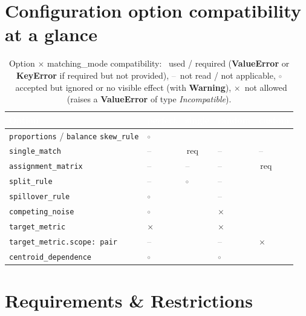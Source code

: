 \documentclass[a4paper,11pt]{article}
\newcommand{\cok}{\textcolor{okgreen}{\checkmark}}
\newcommand{\cign}{\textcolor{gray}{$\circ$}}
\newcommand{\cno}{\textcolor{valred}{$\times$}}
\newcommand{\cna}{\textcolor{gray}{--}}
\newcommand{\headrow}{\rowcolor{headblue}}
\newcommand{\hc}[1]{\textcolor{white}{\bfseries #1}}
\begin{document}
\section{Configuration option compatibility at a glance}
\begin{table}[!h]
\centering\small
\begin{threeparttable}
\begin{tabular}{@{}L{4.9cm} *{4}{>{\centering\arraybackslash}p{1.9cm}}@{}}
\toprule
\headrow
\hc{Option} & \hc{perfect} & \hc{single} & \hc{random} & \hc{custom} \\
\midrule
\texttt{proportions} / \texttt{balance} \texttt{skew\_rule} & \cign & \cok & \cok & \cok \\
\texttt{single\_match} & \cna & \cok\,req & \cna & \cna \\
\texttt{assignment\_matrix} & \cna & \cna & \cna & \cok\,req \\
\texttt{split\_rule} & \cna & \cign & \cna & \cok \\
\texttt{spillover\_rule} & \cign & \cok & \cna & \cok \\
\texttt{competing\_noise} & \cign & \cok & \cno & \cok \\
\texttt{target\_metric} & \cno & \cok & \cno & \cok \\
\texttt{target\_metric.scope: pair} & \cna & \cok & \cna & \cno \\
\texttt{centroid\_dependence} & \cign & \cok & \cign & \cok \\
\bottomrule
\end{tabular}
\caption{Option \texorpdfstring{$\times$}{x} matching\_mode compatibility: \cok~used / required (\textbf{ValueError} or \textbf{KeyError} if required but not provided), \cna~not read / not applicable, \cign~accepted but ignored or no visible effect (with \textbf{Warning}), \cno~not allowed (raises a \textbf{ValueError} of type \textit{Incompatible}).}
\end{threeparttable}
\end{table}

\newpage

\section{\texorpdfstring{\quad Requirements \& Restrictions}{Requirements \& Restrictions}}
\end{document}
